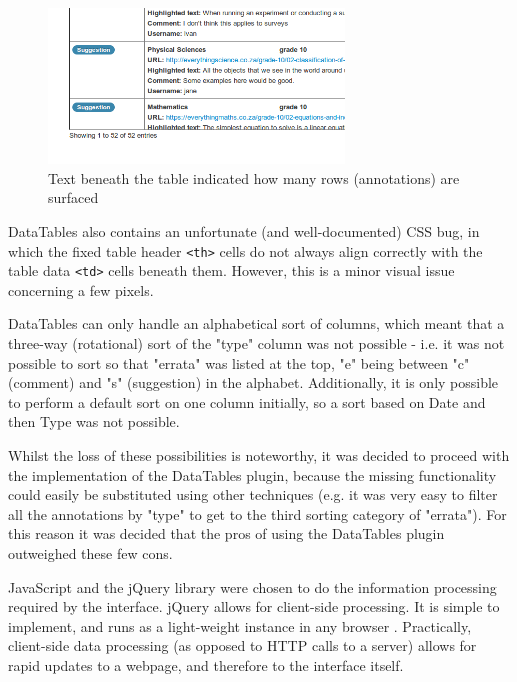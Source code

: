 \begin{figure}[h!]
    \centering
    \includegraphics[width=0.7\textwidth]{Figures/V1/breadcrumbs.png}
 \caption{Text beneath the table indicated how many rows (annotations) are surfaced}
 \label{fig:breadcrumbs}
\end{figure}

DataTables also contains an unfortunate (and well-documented) CSS bug, in which the fixed table header \verb|<th>|                                                                                                                cells do not always align correctly with the table data \verb|<td>| cells beneath them. However, this is a minor visual issue concerning a few pixels.

DataTables can only handle an alphabetical sort of columns, which meant that a three-way (rotational) sort of the "type" column was not possible - i.e. it was not possible to sort so that "errata" was listed at the top, "e" being between "c" (comment) and "s" (suggestion) in the alphabet. Additionally, it is only possible to perform a default sort on one column initially, so a sort based on Date and then Type was not possible.

Whilst the loss of these possibilities is noteworthy, it was decided to proceed with the implementation of the DataTables plugin, because the missing functionality could easily be substituted using other techniques (e.g. it was very easy to filter all the annotations by "type" to get to the third sorting category of "errata"). For this reason it was decided that the pros of using the DataTables plugin outweighed these few cons.

JavaScript and the jQuery library were chosen to do the information processing required by the interface. jQuery allows for client-side processing. It is simple to implement, and runs as a light-weight instance in any browser \citep{jQuery} \citep{JS}. Practically, client-side data processing (as opposed to HTTP calls to a server) allows for rapid updates to a webpage, and therefore to the interface itself. 

